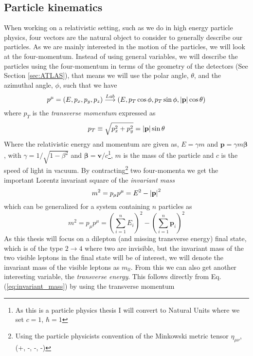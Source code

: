 \documentclass[12pt, a4paper]{book}
\begin{document}
\subsection{Particle kinematics}\label{sec:particle_kinematics}
When working on a relativistic setting, such as we do in high energy particle physics, four vectors are the natural object to consider to generally describe our particles. As we are mainly interested in the motion of the particles, 
we will look at the four-momentum. Instead of using general variables, we will describe the particles using the four-momentum in terms of the geometry of the detectors (See Section \ref{sec:ATLAS}), that means we will use 
the polar angle, $\theta$, and the azimuthal angle, $\phi$, such that we have
\begin{equation}\label{eq:four-momentum}
    p^\mu = (E, p_x, p_y, p_z) \overset{Lab}{\longrightarrow} (E, p_T\cos\phi, p_T\sin\phi, \abs{\mathbf{p}}\cos\theta)
\end{equation}
where $p_T$ is the \textit{transverse momentum} expressed as
\begin{equation}\label{eq:transverse_momentum}
    p_T \equiv\sqrt{p_x^2 +p_y^2} = \abs{\mathbf{p}}\sin\theta
\end{equation}
Where the relativistic energy and momentum are given as, $E=\gamma m$ and $\mathbf{p}=\gamma m\bm\beta$, with $\gamma = 1/\sqrt{1-\beta^2}$ and $\bm\beta = \mathbf{v}/c$\footnote{As this is a particle physics thesis I will convert to Natural Units where we set $c=1$, $\hbar = 1$}, $m$ is the mass of the particle 
and $c$ is the speed of light in vacuum. By contracting\footnote{Using the particle physicists convention of the Minkowski metric tensor $\eta_{\mu\nu}$,  (+, -, -, -)} two four-momenta we get the important Lorentz invariant 
square of the \textit{invariant mass}
$$
    m^2 = p_\mu p^\mu = E^2 - \abs{\mathbf{p}}^2 
$$
which can be generalized for a system containing $n$ particles as
\begin{equation}\label{eq:invariant_mass}
    m^2 = p_\mu p^\mu = \left(\sum_{i=1}^n E_i\right)^2 - \left(\sum_{i=1}^n\mathbf{p}_i\right)^2
\end{equation}
As this thesis will focus on a dilepton (and missing transverse energy) final state, which is of the type $2\rightarrow4$ where two are invisible, but the invariant mass of the two visible leptons in the final state will be of interest, 
we will denote the invariant mass of the visible leptons as $m_{ll}$. From this we can also get another interesting variable, the \textit{transverse energy}. This follows directly from Eq. (\ref{eq:invariant_mass}) by using the transverse momentum
\end{document}
